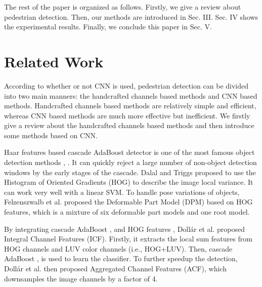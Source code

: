 \documentclass[journal]{IEEEtran}
\begin{document}
The rest of the paper is organized as follows. Firstly, we give a review about pedestrian detection. Then, our methods are introduced in Sec. III. Sec. IV shows the experimental results. Finally, we conclude this paper in Sec. V.

\section{Related Work}
According to whether or not CNN is used, pedestrian detection can be divided into two main manners: the handcrafted channels based methods and CNN based methods. Handcrafted channels based methods are relatively simple and efficient, whereas CNN based methods are much more effective but inefficient. We firstly give a review about the handcrafted channels based methods and then introduce some methods based on CNN.

Haar features based cascade AdaBoost detector is one of the most famous object detection methods \cite{Viola_Haar_IJCV_2004}, \cite{Pang_SF_TC_2016}. It can quickly reject a large number of non-object detection windows by the early stages of the cascade. Dalal and Triggs \cite{Dalal_HOG_CVPR_2005} proposed to use the Histogram of Oriented Gradients (HOG) to describe the image local variance. It can work very well with a linear SVM. To handle pose variations of objects, Felzenszwalb et al. \cite{Felzenszwalb_DPM_PAMI_2010} proposed the Deformable Part Model (DPM) based on HOG features, which is a mixture of six deformable part models and one root model.

By integrating cascade AdaBoost \cite{Viola_Haar_IJCV_2004}, \cite{Bourdev_SoftCascade_CVPR_2005} and HOG features \cite{Dalal_HOG_CVPR_2005}, Doll\'ar et al. \cite{Dollar_ICF_BMVC_2009} proposed Integral Channel Features (ICF). Firstly, it extracts the local sum features from HOG channels and LUV color channels (i.e., HOG+LUV). Then, cascade AdaBoost \cite{Bourdev_SoftCascade_CVPR_2005}, \cite{Zhang_MIP_NIPS_2007} is used to learn the classifier. To further speedup the detection, Doll\'ar et al. \cite{Dollar_ACF_PAMI_2014} then proposed Aggregated Channel Features (ACF), which downsamples the image channels by a factor of 4. 
\end{document}
